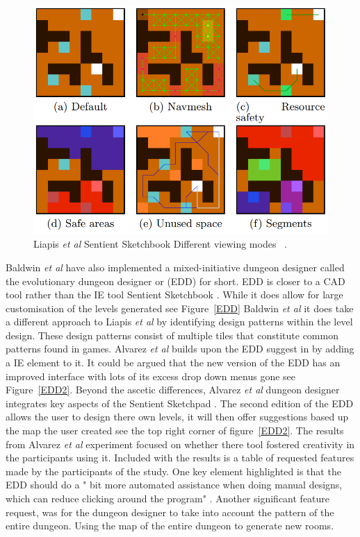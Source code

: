 \documentclass[journal]{IEEEtran}
\begin{document}
\begin{figure}[h]
	\includegraphics[width=1.0\linewidth]{SentientSketchbook2.PNG}
	\caption{Liapis \textit{et al} Sentient Sketchbook Different viewing modes ~\cite{liapis2013sentient}.}
	\label{Sketchbook2}
\end{figure} 

Baldwin \textit{et al} \cite{baldwin2017mixed} have also implemented a mixed-initiative dungeon designer called the evolutionary dungeon designer or (EDD) for short. EDD is closer to a CAD tool rather than the IE tool Sentient Sketchbook \cite{liapis2013sentient}. While it does allow for large customisation of the levels generated  see Figure~\ref{EDD}  Baldwin \textit{et al} it does take a different approach to Liapis  \textit{et al}\cite{liapis2013sentient} by identifying design patterns within the level design. These design patterns consist of multiple tiles that constitute common patterns found in games. Alvarez \textit{et al}\cite{alvarez2018fostering} builds upon the EDD suggest in \cite{baldwin2017mixed} by adding a IE element to it. It could be argued that the new version of the EDD has an improved interface with lots of its excess drop down menus gone see Figure~\ref{EDD2}. Beyond the ascetic differences, Alvarez \textit{et al}\cite{alvarez2018fostering} dungeon designer integrates key aspects of  the Sentient Sketchpad \cite{liapis2013sentient}. The second edition of the EDD allows the user to design there own levels, it will then offer suggestions based up the map the user created see the top right corner of figure~\ref{EDD2}.  The results from Alvarez \textit{et al}\cite{alvarez2018fostering} experiment focused on whether there tool fostered creativity in the participants using it. Included with the results is a table of requested features made by the participants of the study. One key element highlighted is that the EDD should do a " bit more automated assistance when doing manual designs, which can reduce clicking around the program" \cite[Table 2]{alvarez2018fostering}. Another significant  feature request, was for the dungeon designer to take into account the pattern of the entire dungeon. Using the map of the entire dungeon to generate new rooms.
\end{document}
